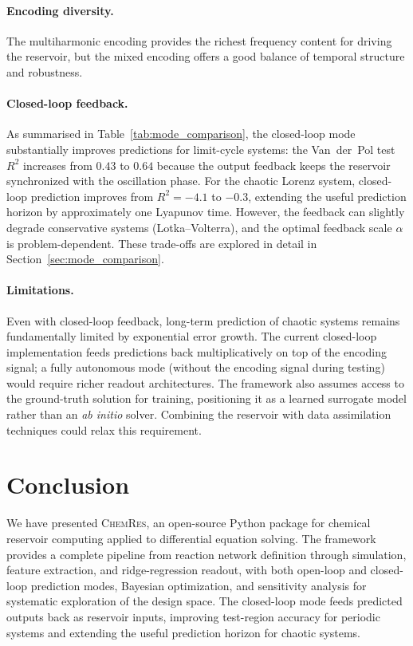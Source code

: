 \documentclass[11pt,twocolumn]{article}
\newcommand{\software}{\textsc{ChemRes}}
\begin{document}
\paragraph{Encoding diversity.}
The multiharmonic encoding provides the richest frequency content for
driving the reservoir, but the mixed encoding offers a good balance of
temporal structure and robustness.

\paragraph{Closed-loop feedback.}
As summarised in Table~\ref{tab:mode_comparison}, the closed-loop mode
substantially improves predictions for limit-cycle systems: the Van~der~Pol
test $R^2$ increases from $0.43$ to $0.64$ because the output feedback
keeps the reservoir synchronized with the oscillation phase.  For the
chaotic Lorenz system, closed-loop prediction improves from $R^2 = -4.1$
to $-0.3$, extending the useful prediction horizon by approximately one
Lyapunov time.  However, the feedback can slightly degrade conservative
systems (Lotka--Volterra), and the optimal feedback scale $\alpha$ is
problem-dependent.  These trade-offs are explored in detail in
Section~\ref{sec:mode_comparison}.

\paragraph{Limitations.}
Even with closed-loop feedback, long-term prediction of chaotic systems
remains fundamentally limited by exponential error growth.  The current
closed-loop implementation feeds predictions back multiplicatively on top
of the encoding signal; a fully autonomous mode (without the encoding
signal during testing) would require richer readout architectures.
The framework also assumes access to the ground-truth solution for
training, positioning it as a learned surrogate model rather than an
\emph{ab initio} solver.  Combining the reservoir with data assimilation
techniques could relax this requirement.

\section{Conclusion}
\label{sec:conclusion}

We have presented \software{}, an open-source Python package for chemical
reservoir computing applied to differential equation solving.  The framework
provides a complete pipeline from reaction network definition through
simulation, feature extraction, and ridge-regression readout, with both
open-loop and closed-loop prediction modes, Bayesian optimization, and
sensitivity analysis for systematic exploration of the design space.  The
closed-loop mode feeds predicted outputs back as reservoir inputs, improving
test-region accuracy for periodic systems and extending the useful prediction
horizon for chaotic systems.
\end{document}
